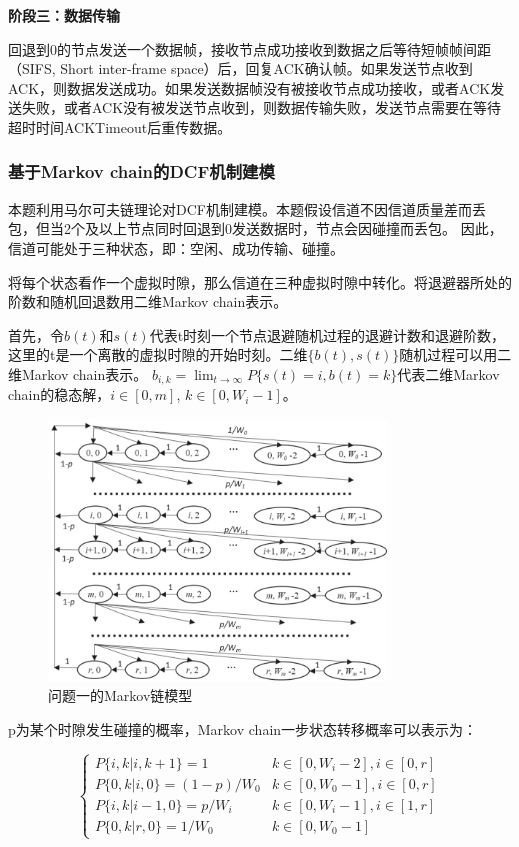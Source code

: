 \documentclass[bwprint]{gmcmthesis}
\begin{document}
\textbf{阶段三：数据传输}

回退到0的节点发送一个数据帧，接收节点成功接收到数据之后等待短帧帧间距（SIFS, Short inter-frame space）后，回复ACK确认帧。如果发送节点收到ACK，则数据发送成功。如果发送数据帧没有被接收节点成功接收，或者ACK发送失败，或者ACK没有被发送节点收到，则数据传输失败，发送节点需要在等待超时时间ACKTimeout后重传数据。

\subsubsection{基于Markov chain的DCF机制建模}

本题利用马尔可夫链理论对DCF机制建模。本题假设信道不因信道质量差而丢包，但当2个及以上节点同时回退到0发送数据时，节点会因碰撞而丢包。
因此，信道可能处于三种状态，即：空闲、成功传输、碰撞。

将每个状态看作一个虚拟时隙，那么信道在三种虚拟时隙中转化。将退避器所处的阶数和随机回退数用二维Markov chain表示\cite{book1}。

首先，令$b(t)$和$s(t)$代表t时刻一个节点退避随机过程的退避计数和退避阶数，这里的t是一个离散的虚拟时隙的开始时刻。二维$\{b(t), s(t)\}$随机过程可以用二维Markov chain表示。 $b_{i,k}=\displaystyle \lim_{t \to \infty} P\{s(t)=i,b(t)=k\}$代表二维Markov chain的稳态解，$i\in[0, m]$, $k\in[0, W_i-1]$。

\begin{figure}[H]
\centering
\includegraphics[width=0.8\textwidth]{figures/mar1.png}
\caption{问题一的Markov链模型}
\label{fig:mar1}
\end{figure}

p为某个时隙发生碰撞的概率，Markov chain一步状态转移概率可以表示为：

\begin{equation}
\left\{\begin{matrix}
P\{i,k|i,k+1\}=1 & k\in [0,W_i-2],i\in[0,r]\\
P\{0,k|i,0\}=(1-p)/W_0 & k\in[0,W_0-1],i\in[0,r]\\
P\{i,k|i-1,0\}=p/W_i & k\in[0,W_i-1],i\in[1,r]\\
P\{0,k|r,0\}=1/W_0 & k\in [0,W_0-1]
\end{matrix}\right.
    \label{eq:1.1.4}
\end{equation}
\end{document}

